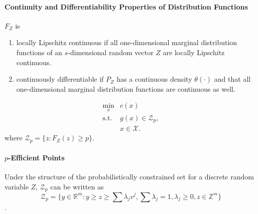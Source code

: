 \documentclass[a4pper,11pt]{article}
\begin{document}
\paragraph{Continuity and Differentiability Properties of Distribution Functions}
$F_Z$ is
\begin{enumerate}
    \item locally Lipschitz continuous if all one-dimensional marginal distribution functions of an $s$-dimensional random vector $Z$ are locally Lipschitz continuous.\\
    \item continuously differentiable if $P_Z$ has a continuous density $\theta(\cdot)$ and that all one-dimensional marginal distribution functions are continuous as well.\\
\end{enumerate}
\begin{equation}
    \label{4.1}
    \begin{array}{ll}
        \min_x      & c(x)                  \\
        \text{s.t.} & g(x)\in \mathcal Z_p, \\
                    & x\in \mathcal X.
    \end{array}
\end{equation}
where $\mathcal Z_p=\{z:F_Z(z)\geq p\}$.
\paragraph{$p$-Efficient Points}

Under the structure of the probabilistically constrained set for a discrete random variable $Z$, $\mathcal Z_p$ can be written as
$$\mathcal Z_p=\{y\in \mathbb R^m:y\geq z\geq \sum\lambda_j v^j,\sum \lambda_j=1,\lambda_j\geq 0, z\in \mathbb Z^m\}$$.
\end{document}
